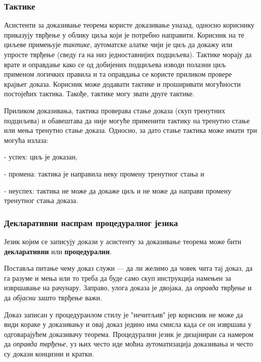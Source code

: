 \subsubsection{Тактике}

Асистенти за доказивање теорема користе доказивање уназад, односно
кориснику приказују тврђење у облику циља који је потребно
направити. Корисник на те циљеве примењује \emph{тактике}, аутоматске
алатке чији је циљ да докажу или упросте тврђење (сведу га на низ
једноставнијих подциљева). Тактике морају да врате и оправдање како се
од добијених подциљева изводи полазни циљ применом логичких правила и
та оправдања се користе приликом провере крајњег доказа. Корисник може
додавати тактике и проширивати могућности постојећих тактика. Такође,
тактике могу звати друге тактике.

Приликом доказивања, тактика проверава стање доказа (скуп тренутних
подциљева) и обавештава да није могуће применити тактику на тренутно
стање или мења тренутно стање доказа. Односно, за дато стање тактика
може имати три могућа излаза:
\begin{description}
\item{-} успех: циљ је доказан,
\item{-} промена: тактика је направила неку промену тренутног стања и
\item{-} неуспех: тактика не може да докаже циљ и не може да направи
  промену тренутног стања доказа.
\end{description}


\subsubsection{Декларативни наспрам процедуралног језика}

Језик којим се записују докази у асистенту за доказивање теорема може
бити \textbf{декларативни} или \textbf{процедурални}. 

Поставља питање чему доказ служи --- да ли желимо да човек чита тај
доказ, да га разуме и мења или то треба да буде само скуп инструкција
намењен за извршавање на рачунару. Заправо, улога доказа је двојака,
да \emph{оправда} тврђење и да \emph{објасни} зашто тврђење важи.

Доказ записан у процедуранлом стилу је "нечитљив" јер корисник не може
да види кораке у доказивању и овај доказ једино има смисла када се он
извршава у одговарајућем доказивачу теорема. Процедурални језик је
дизајниран са намером да \emph{оправда тврђење}, уз њих често иде
моћна аутоматизација доказивања и често су докази концизни и кратки.

